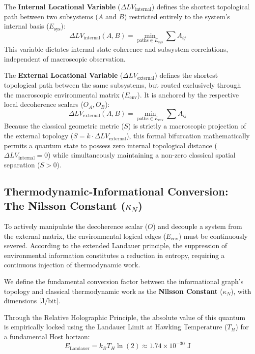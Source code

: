 \documentclass[12pt,a4paper]{article}
\begin{document}
The \textbf{Internal Locational Variable} ($\Delta LV_{\mathrm{internal}}$) defines the shortest topological path between two subsystems ($A$ and $B$) restricted entirely to the system's internal basis ($E_{\mathrm{sys}}$):
\begin{equation}
\Delta LV_{\mathrm{internal}}(A, B) = \min_{\mathrm{paths} \in E_{\mathrm{sys}}} \sum A_{ij}
\end{equation}
This variable dictates internal state coherence and subsystem correlations, independent of macroscopic observation.

The \textbf{External Locational Variable} ($\Delta LV_{\mathrm{external}}$) defines the shortest topological path between the same subsystems, but routed exclusively through the macroscopic environmental matrix ($E_{\mathrm{env}}$). It is anchored by the respective local decoherence scalars ($O_A, O_B$):
\begin{equation}
\Delta LV_{\mathrm{external}}(A, B) = \min_{\mathrm{paths} \in E_{\mathrm{env}}} \sum A_{ij}
\end{equation}
Because the classical geometric metric ($S$) is strictly a macroscopic projection of the external topology ($S = k \cdot \Delta LV_{\mathrm{external}}$), this formal bifurcation mathematically permits a quantum state to possess zero internal topological distance ($\Delta LV_{\mathrm{internal}} = 0$) while simultaneously maintaining a non-zero classical spatial separation ($S > 0$).

\subsection{Thermodynamic-Informational Conversion: The Nilsson Constant ($\kappa_N$)}
To actively manipulate the decoherence scalar ($O$) and decouple a system from the external matrix, the environmental logical edges ($E_{\mathrm{env}}$) must be continuously severed. According to the extended Landauer principle, the suppression of environmental information constitutes a reduction in entropy, requiring a continuous injection of thermodynamic work.

We define the fundamental conversion factor between the informational graph's topology and classical thermodynamic work as the \textbf{Nilsson Constant} ($\kappa_N$), with dimensions [J/bit]. 

Through the Relative Holographic Principle, the absolute value of this quantum is empirically locked using the Landauer Limit at Hawking Temperature ($T_H$) for a fundamental Host horizon:
\begin{equation}
E_{\mathrm{Landauer}} = k_B T_H \ln(2) \approx 1.74 \times 10^{-30} \text{ J}
\end{equation}
\end{document}
